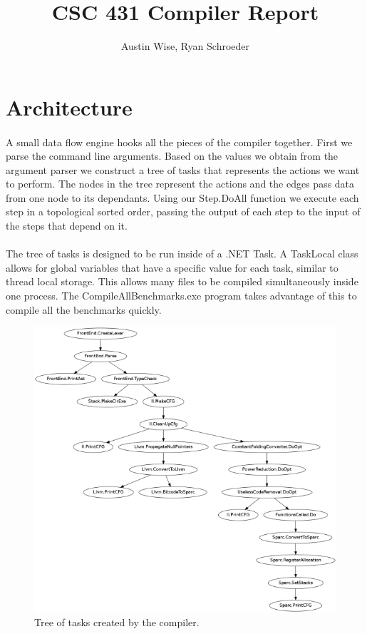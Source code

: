 \documentclass[12pt]{article}
\title{CSC 431 Compiler Report}
\date{}
\author{Austin Wise, Ryan Schroeder}
\begin{document}
\maketitle
\tableofcontents

\pagebreak

\section{Architecture}
\paragraph{}
A small data flow engine hooks all the pieces of the compiler together.
First we parse the command line arguments.
Based on the values we obtain from the argument parser we construct a tree of tasks that represents the actions we want to perform.
The nodes in the tree represent the actions and the edges pass data from one node to its dependants.
Using our Step.DoAll function we execute each step in a topological sorted order, passing the output of each step to the input of the steps that depend on it.

\paragraph{}
The tree of tasks is designed to be run inside of a .NET Task.
A TaskLocal class allows for global variables that have a specific value for each task, similar to thread local storage.
This allows many files to be compiled simultaneously inside one process.
The CompileAllBenchmarks.exe program takes advantage of this to compile all the benchmarks quickly.

\begin{figure}
\includegraphics{compSteps.png}
\caption{Tree of tasks created by the compiler.}
\label{compSteps}
\end{figure}
\end{document}
